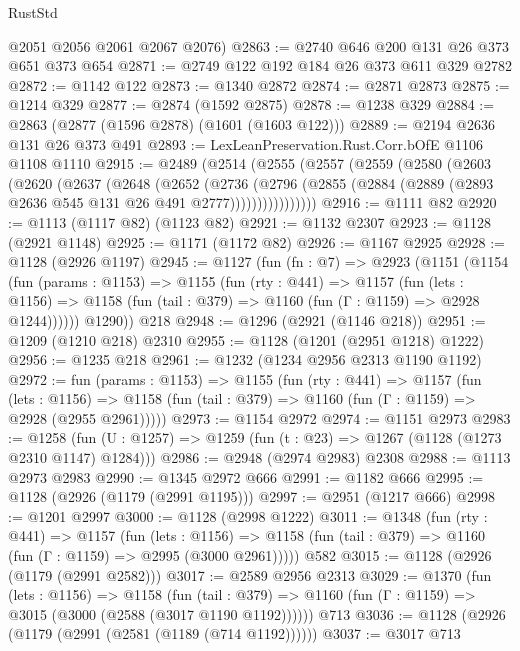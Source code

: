 \begin{lexlean}{RustStd}
\begin{coremodule}
      @2051
      @2056
      @2061
      @2067
      @2076)
@2863 := @2740 @646 @200 @131 @26 @373 @651 @373 @654
@2871 := @2749 @122 @192 @184 @26 @373 @611 @329 @2782
@2872 := @1142 @122
@2873 := @1340 @2872
@2874 := @2871 @2873
@2875 := @1214 @329
@2877 := @2874 (@1592 @2875)
@2878 := @1238 @329
@2884 := @2863 (@2877 (@1596 @2878) (@1601 (@1603 @122)))
@2889 := @2194 @2636 @131 @26 @373 @491
@2893 := LexLeanPreservation.Rust.Corr.bOfE @1106 @1108 @1110
@2915 := @2489
    (@2514
      (@2555
        (@2557
          (@2559
            (@2580
              (@2603
                (@2620
                  (@2637
                    (@2648
                      (@2652
                        (@2736
                          (@2796
                            (@2855
                              (@2884 (@2889 (@2893 @2636 @545 @131 @26 @491 @2777))))))))))))))))
@2916 := @1111 @82
@2920 := @1113 (@1117 @82) (@1123 @82)
@2921 := @1132 @2307
@2923 := @1128 (@2921 @1148)
@2925 := @1171 (@1172 @82)
@2926 := @1167 @2925
@2928 := @1128 (@2926 @1197)
@2945 := @1127
    (fun (fn : @7) =>
    @2923
      (@1151
        (@1154
          (fun (params : @1153) =>
          @1155
            (fun (rty : @441) =>
            @1157
              (fun (lets : @1156) =>
              @1158 (fun (tail : @379) => @1160 (fun (Γ : @1159) => @2928 @1244))))))
        @1290))
    @218
@2948 := @1296 (@2921 (@1146 @218))
@2951 := @1209 (@1210 @218) @2310
@2955 := @1128 (@1201 (@2951 @1218) @1222)
@2956 := @1235 @218
@2961 := @1232 (@1234 @2956 @2313 @1190 @1192)
@2972 := fun (params : @1153) =>
  @1155
    (fun (rty : @441) =>
    @1157
      (fun (lets : @1156) =>
      @1158 (fun (tail : @379) => @1160 (fun (Γ : @1159) => @2928 (@2955 @2961)))))
@2973 := @1154 @2972
@2974 := @1151 @2973
@2983 := @1258 (fun (U : @1257) => @1259 (fun (t : @23) => @1267 (@1128 (@1273 @2310 @1147) @1284)))
@2986 := @2948 (@2974 @2983) @2308
@2988 := @1113 @2973 @2983
@2990 := @1345 @2972 @666
@2991 := @1182 @666
@2995 := @1128 (@2926 (@1179 (@2991 @1195)))
@2997 := @2951 (@1217 @666)
@2998 := @1201 @2997
@3000 := @1128 (@2998 @1222)
@3011 := @1348
    (fun (rty : @441) =>
    @1157
      (fun (lets : @1156) =>
      @1158 (fun (tail : @379) => @1160 (fun (Γ : @1159) => @2995 (@3000 @2961)))))
    @582
@3015 := @1128 (@2926 (@1179 (@2991 @2582)))
@3017 := @2589 @2956 @2313
@3029 := @1370
    (fun (lets : @1156) =>
    @1158
      (fun (tail : @379) => @1160 (fun (Γ : @1159) => @3015 (@3000 (@2588 (@3017 @1190 @1192))))))
    @713
@3036 := @1128 (@2926 (@1179 (@2991 (@2581 (@1189 (@714 @1192))))))
@3037 := @3017 @713

\end{coremodule}
\end{lexlean}
